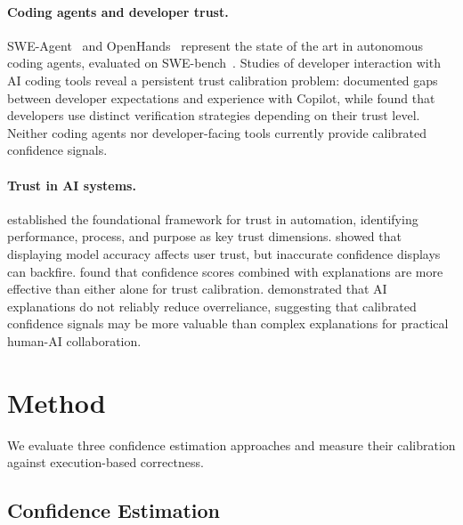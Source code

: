 \documentclass{article}
\begin{document}
\paragraph{Coding agents and developer trust.}
SWE-Agent~\citep{yang2024swe} and OpenHands~\citep{wang2024opendevin} represent the state of the art in autonomous coding agents, evaluated on SWE-bench~\citep{jimenez2024swe}. Studies of developer interaction with AI coding tools reveal a persistent trust calibration problem: \citet{vaithilingam2022expectation} documented gaps between developer expectations and experience with Copilot, while \citet{mozannar2024reading} found that developers use distinct verification strategies depending on their trust level. Neither coding agents nor developer-facing tools currently provide calibrated confidence signals.

\paragraph{Trust in AI systems.}
\citet{lee2004trust} established the foundational framework for trust in automation, identifying performance, process, and purpose as key trust dimensions. \citet{yin2019understanding} showed that displaying model accuracy affects user trust, but inaccurate confidence displays can backfire. \citet{zhang2020effect} found that confidence scores combined with explanations are more effective than either alone for trust calibration. \citet{bansal2021does} demonstrated that AI explanations do not reliably reduce overreliance, suggesting that calibrated confidence signals may be more valuable than complex explanations for practical human-AI collaboration.

\section{Method}
\label{sec:method}

We evaluate three confidence estimation approaches and measure their calibration against execution-based correctness.

\subsection{Confidence Estimation}
\label{sec:confidence}
\end{document}
